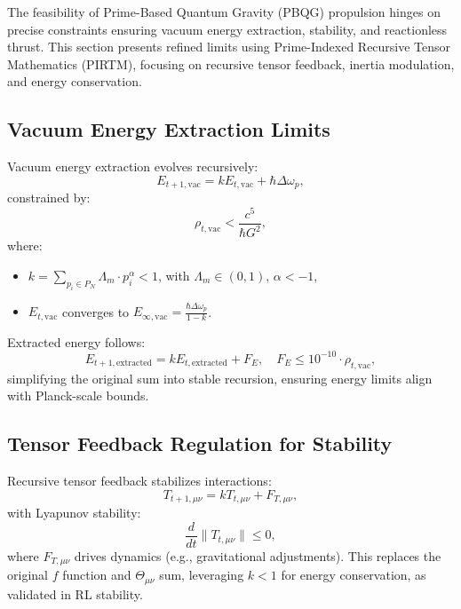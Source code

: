 \documentclass{article}
\theoremstyle{plain}
\begin{document}
The feasibility of Prime-Based Quantum Gravity (PBQG) propulsion hinges on precise constraints ensuring vacuum energy extraction, stability, and reactionless thrust. This section presents refined limits using Prime-Indexed Recursive Tensor Mathematics (PIRTM), focusing on recursive tensor feedback, inertia modulation, and energy conservation.

\subsection{Vacuum Energy Extraction Limits}
\label{subsec:vacuum_energy}

Vacuum energy extraction evolves recursively:
\begin{equation}
    E_{t+1,\text{vac}} = k E_{t,\text{vac}} + \hbar \Delta \omega_p,
\end{equation}
constrained by:
\begin{equation}
    \rho_{t,\text{vac}} < \frac{c^5}{\hbar G^2},
\end{equation}
where:
\begin{itemize}
    \item \( k = \sum_{p_i \in P_N} \Lambda_m \cdot p_i^\alpha < 1 \), with \( \Lambda_m \in (0, 1) \), \( \alpha < -1 \),
    \item \( E_{t,\text{vac}} \) converges to \( E_{\infty,\text{vac}} = \frac{\hbar \Delta \omega_p}{1 - k} \).
\end{itemize}
Extracted energy follows:
\begin{equation}
    E_{t+1,\text{extracted}} = k E_{t,\text{extracted}} + F_E, \quad F_E \leq 10^{-10} \cdot \rho_{t,\text{vac}},
\end{equation}
simplifying the original sum into stable recursion, ensuring energy limits align with Planck-scale bounds.

\subsection{Tensor Feedback Regulation for Stability}
\label{subsec:tensor_feedback}

Recursive tensor feedback stabilizes interactions:
\begin{equation}
    T_{t+1,\mu\nu} = k T_{t,\mu\nu} + F_{T,\mu\nu},
\end{equation}
with Lyapunov stability:
\begin{equation}
    \frac{d}{dt} \| T_{t,\mu\nu} \| \leq 0,
\end{equation}
where \( F_{T,\mu\nu} \) drives dynamics (e.g., gravitational adjustments). This replaces the original \( f \) function and \( \Theta_{\mu\nu} \) sum, leveraging \( k < 1 \) for energy conservation, as validated in RL stability.
\end{document}
